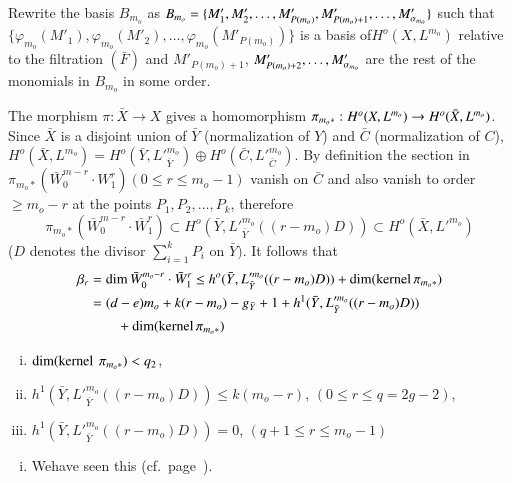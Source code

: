 {\noindent
Rewrite the basis $B_{m_o}$ as $B_{m_o}= \{ M'_1, M'_2,\ldots ,
M'_{P(m_o)}, M'_{P(m_o)+1} , \ldots,\break M'_{\alpha_{m_o}}\} $ such that
$\{\varphi_{m_o} (M'_1), \varphi_{m_o} (M'_{2}), \ldots,
\varphi_{m_o}(M'_{P(m_o)})\}$ is a basis of\break $H^o (X, L^{m_o})$
relative to the filtration $(\bar{F})$ and $M'_{P(m_o)+1}$,
$M'_{P(m_o)+2}, \ldots,\break M'_{\alpha_{m_o}}$ are the rest of the
monomials in $B_{m_o}$ in some order.  

The morphism $\pi : \bar{X} \to X$ gives a homomorphism $\pi_{m_o *} :
H^o (X,\break L^{m_o}) \to H^o (\bar{X}, L^{m_o})$. Since $\bar{X}$ is a
disjoint union of $\bar{Y}$ (normalization of $Y$) and $\bar{C}$
(normalization of $C$), $H^o (\bar{X}, L^{m_o}) = H^{o}( \bar{Y},
L'^{m_o}_{\bar{Y}}) \oplus H^o (\bar{C}, L'^{m_o}_{\bar{C}})$. By definition the
section in $\pi_{m_o*} (\bar{W}^{m-r}_0 \cdot W^r_1)(0 \le r \le
m_o-1)$ vanish on $\bar{C}$ and also vanish to order $\ge m_o -r$ at
the points $P_1, P_2, \ldots, P_k$, therefore 
$$
\pi_{m_o*} (\bar{W}^{m-r}_0 \cdot \bar{W}^{r}_{1}) \subset H^o
(\bar{Y}, L'^{m_o}_{\bar{Y}} ((r-m_o)D)) \subset H^o (\bar{X},
L'^{m_o}) 
$$
($D$ denotes the divisor $\sum\limits^{k}_{i =1} P_i$ on
$\bar{Y})$. It follows that  
\begin{align*}
\beta_r & = \dim \bar{W}^{m_o-r}_0 \cdot \bar{W}^{r}_{1} \le h^o
(\bar{Y}, L'^{m_o}_{\bar{Y}} ((r-m_o)D)) + \dim (\operatorname{kernel}
\pi_{m_o *})\\ 
& = (d - e)m_o + k (r-m_o)-g_{\bar{Y}} + 1 +h^1 (\bar{Y},
L'^{m_o}_{\bar{Y}}((r-m_o)D))\\
&\qquad + \dim (\operatorname{kernel} \pi_{m_o *}) 
\end{align*}



\begin{enumerate}[i)]
\item $\dim (\operatorname{kernel} ~ \pi_{m_o *}) < q_2$, 

\item $h^1 (\bar{Y}, L'^{m_o}_{\bar{Y}} ((r-m_o)D)) \le k(m_o -r)$,
  \quad $(0  \le r \le q = 2g-2)$, 

\item $h^1 (\bar{Y}, L'^{m_o}_{\bar{Y}} ((r-m_o)D))=0$, \quad $(q + 1 \le r\le
  m_o -1)$ 
\end{enumerate}

\begin{enumerate}[i)]
\item We\pageoriginale have seen this (cf.\ page~\pageref{c1:claim}).


\end{enumerate}}
